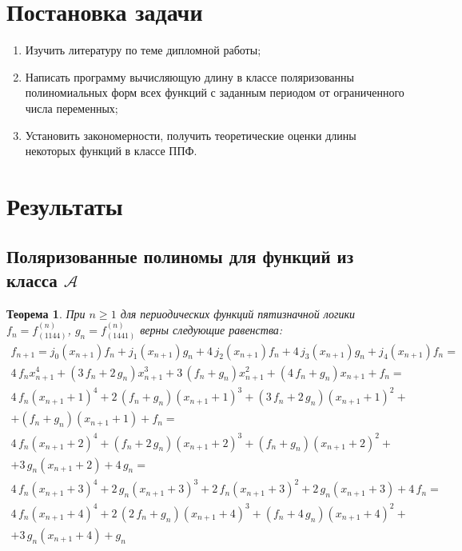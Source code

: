 \documentclass[bibliography=totoc, a4paper, 14pt]{extarticle}
\let\stdsection\section
\renewcommand\section{\newpage\stdsection}
\newtheorem{myth}{Теорема}
\begin{document}
\section{Постановка задачи}
\begin{enumerate}
\item Изучить литературу по теме дипломной работы;
\item Написать программу вычисляющую длину в классе поляризованны полиномиальных форм всех функций
    с заданным периодом от ограниченного числа переменных;
\item Установить закономерности, получить теоретические оценки длины некоторых функций в классе ППФ.
\end{enumerate}

\section{Результаты}
\subsection{Поляризованные полиномы для функций из класса $\mathcal{A}$}

\begin{myth} При $n \geqslant 1 $ для периодических функций пятизначной логики $f_n = f^{\left(n\right)}_{\left(1144\right)}$,
$g_n = f^{\left(n\right)}_{\left(1441\right)}$ верны следующие равенства:
$$\begin{array}{l}
 f_{n+1} = j_0(x_{n+1})f_n + j_1(x_{n+1})g_n + 4\,j_2(x_{n+1})f_n + 4\,j_3(x_{n+1})g_n + j_4(x_{n+1})f_n =\\
4 \, f_{n} x_{n+1}^{4} + {\left(3 \, f_{n} + 2 \, g_{n}\right)} x_{n+1}^{3} + 3 \, {\left(f_{n} + g_{n}\right)} x_{n+1}^{2} + {\left(4 \, f_{n} + g_{n}\right)} x_{n+1} + f_{n}=\\
4 \, f_{n} {\left(x_{n+1} + 1\right)}^{4} + 2 \, {\left(f_{n} + g_{n}\right)} {\left(x_{n+1} + 1\right)}^{3} + {\left(3 \, f_{n} + 2 \, g_{n}\right)} {\left(x_{n+1} + 1\right)}^{2} + \\
+ {\left(f_{n} + g_{n}\right)} {\left(x_{n+1} + 1\right)} + f_{n}=\\
4 \, f_{n} {\left(x_{n+1} + 2\right)}^{4} + {\left(f_{n} + 2 \, g_{n}\right)} {\left(x_{n+1} + 2\right)}^{3} + {\left(f_{n} + g_{n}\right)} {\left(x_{n+1} + 2\right)}^{2} + \\
+ 3 \, g_{n} {\left(x_{n+1} + 2\right)} + 4 \, g_{n}=\\
4 \, f_{n} {\left(x_{n+1} + 3\right)}^{4} + 2 \, g_{n} {\left(x_{n+1} + 3\right)}^{3} + 2 \, f_{n} {\left(x_{n+1} + 3\right)}^{2} + 2 \, g_{n} {\left(x_{n+1} + 3\right)} + 4 \, f_{n}=\\
4 \, f_{n} {\left(x_{n+1} + 4\right)}^{4} + 2 \, {\left(2 \, f_{n} + g_{n}\right)} {\left(x_{n+1} + 4\right)}^{3} + {\left(f_{n} + 4 \, g_{n}\right)} {\left(x_{n+1} + 4\right)}^{2} + \\
 + 3 \, g_{n} {\left(x_{n+1} + 4\right)} + g_{n}\\
\end{array}$$
\end{myth}
\end{document}
